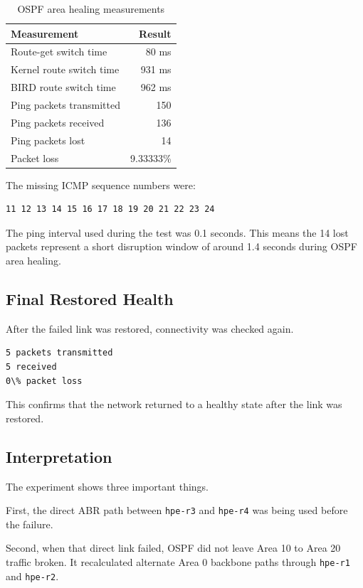 \begin{table}[h]
\centering
\begin{tabular}{|l|r|}
\hline
\textbf{Measurement} & \textbf{Result} \\
\hline
Route-get switch time & 80 ms \\
\hline
Kernel route switch time & 931 ms \\
\hline
BIRD route switch time & 962 ms \\
\hline
Ping packets transmitted & 150 \\
\hline
Ping packets received & 136 \\
\hline
Ping packets lost & 14 \\
\hline
Packet loss & 9.33333\% \\
\hline
\end{tabular}
\caption{OSPF area healing measurements}
\end{table}

The missing ICMP sequence numbers were:

\begin{verbatim}
11 12 13 14 15 16 17 18 19 20 21 22 23 24
\end{verbatim}

The ping interval used during the test was 0.1 seconds. This means the 14 lost packets represent a short disruption window of around 1.4 seconds during OSPF area healing.

\subsection{Final Restored Health}

After the failed link was restored, connectivity was checked again.

\begin{verbatim}
5 packets transmitted
5 received
0\% packet loss
\end{verbatim}

This confirms that the network returned to a healthy state after the link was restored.

\subsection{Interpretation}

The experiment shows three important things.

First, the direct ABR path between \texttt{hpe-r3} and \texttt{hpe-r4} was being used before the failure.

Second, when that direct link failed, OSPF did not leave Area 10 to Area 20 traffic broken. It recalculated alternate Area 0 backbone paths through \texttt{hpe-r1} and \texttt{hpe-r2}.

